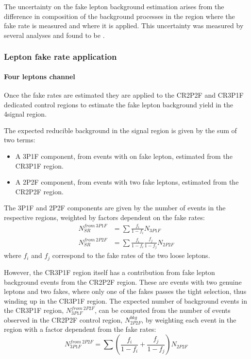 \todo{}

The uncertainty on the fake lepton background estimation arises from the difference in composition of the
background processes in the region where the fake rate is measured and where it is applied.
This uncertainty was measured by several analyses  and found to be .

\subsubsection{Lepton fake rate application}
\paragraph{Four leptons channel\\}
Once the fake rates are estimated they are applied to the CR2P2F and CR3P1F dedicated control regions to estimate the fake lepton background yield in the 4\Pl signal region.

The expected reducible background in the signal region is given by the sum of two terms:
\begin{itemize}
  \item A 3P1F component, from events with on fake lepton, estimated from the CR3P1F region.
  \item A 2P2F component, from events with two fake leptons, estimated from the CR2P2F region.
\end{itemize}

The 3P1F and 2P2F components are given by the number of events in the respective regions, weighted by factors dependent on the fake rates:
\begin{subequations}
  \begin{align}
    \label{eq:lepFR_3P1Fto4P}
    N^{from\ 3P1F}_{SR} &= \sum \frac{f_i}{1-f_i} N_{3P1F}
    \\
    \label{eq:lepFR_2P2Fto4P}
    N^{from\ 2P2F}_{SR} &= \sum \frac{f_i}{1-f_i} \frac{f_j}{1-f_j} N_{2P2F}
  \end{align}
\end{subequations}
where $f_i$ and $f_j$ correspond to the fake rates of the two loose leptons.

However, the CR3P1F region itself has a contribution from fake lepton background events from the CR2P2F region.
These are events with two genuine leptons and two fakes, where only one of the fakes passes the tight selection, thus winding up in the CR3P1F region.
The expected number of background events in the CR3P1F region, $N^{from\ 2P2F}_{3P1F}$,
can be computed from the number of events observed in the CR2P2F control region, $N^{bkg}_{2P2F}$,
by weighting each event in the region with a factor dependent from the fake rates:
\begin{equation}
  \label{eq:lepFR_N3P1F}
  N^{from\ 2P2F}_{3P1F} = \sum \left( \frac{f_i}{1-f_i} + \frac{f_j}{1-f_j} \right) N_{2P2F}
\end{equation}

